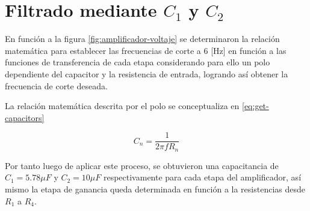 \section*{Filtrado mediante $C_1$ y $C_2$}

En función a la figura \ref{fig:amplificador-voltaje} se determinaron la relación matemática para establecer las frecuencias de corte a 6 [Hz] en función a las funciones de transferencia de cada etapa considerando para ello un polo dependiente del capacitor y la resistencia de entrada, logrando así obtener la frecuencia de corte deseada.

La relación matemática descrita por el polo se conceptualiza en \ref{eq:get-capacitors}

\begin{equation}
	C_n = \frac{1}{2\pi fR_n}
	\label{eq:get-capacitors}
\end{equation}

Por tanto luego de aplicar este proceso, se obtuvieron una capacitancia de $C_1 = 5.78\mu F$ y $C_2 = 10\mu F$ respectivamente para cada etapa del amplificador, así mismo la etapa de ganancia queda determinada en función a la resistencias desde $R_1$ a $R_4$.


